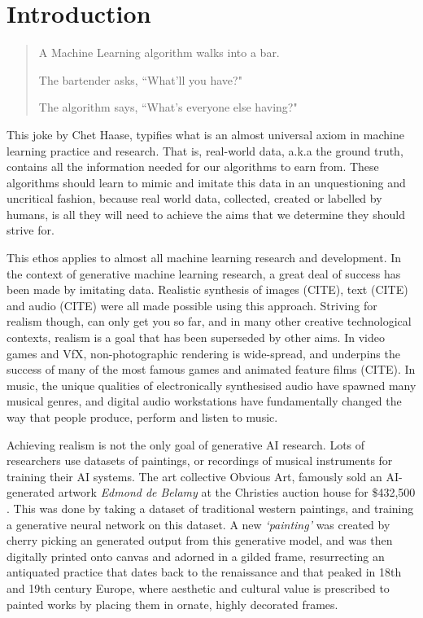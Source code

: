 \chapter{Introduction}
\label{ch:intro}

\begin{quote}A Machine Learning algorithm walks into a bar.

The bartender asks, ``What'll you have?"


The algorithm says, ``What's everyone else having?" \citep{haase2017bar} \end{quote}

This joke by Chet Haase, typifies what is an almost universal axiom in machine learning practice and research. 
That is, real-world data, a.k.a the ground truth, contains all the information needed for our algorithms to earn from. 
These algorithms should learn to mimic and imitate this data in an unquestioning and uncritical fashion, because real world data, collected, created or labelled by humans, is all they will need to achieve the aims that we determine they should strive for.

This ethos applies to almost all machine learning research and development. In the context of generative machine learning research, a great deal of success has been made by imitating data. 
Realistic synthesis of images (CITE), text (CITE) and audio (CITE) were all made possible using this approach. 
Striving for realism though, can only get you so far, and in many other creative technological contexts, realism is a goal that has been superseded by other aims. 
In video games and VfX, non-photographic rendering is wide-spread, and underpins the success of many of the most famous games and animated feature films (CITE). 
In music, the unique qualities of electronically synthesised audio have spawned many musical genres, and digital audio workstations have fundamentally changed the way that people produce, perform and listen to music.

Achieving realism is not the only goal of generative AI research. 
Lots of researchers use datasets of paintings, or recordings of musical instruments for training their AI systems. 
The art collective Obvious Art, famously sold an AI-generated artwork \textit{Edmond de Belamy} at the Christies auction house for \$432,500 \citep{christies2018edmond}.
This was done by taking a dataset of traditional western paintings, and training a generative neural network on this dataset. 
A new \textit{`painting’} was created by cherry picking an generated output from this generative model, and was then digitally printed onto canvas and adorned in a gilded frame, resurrecting an antiquated practice that dates back to the renaissance and that peaked in 18th and 19th century Europe, where aesthetic and cultural value is prescribed to painted works by placing them in ornate, highly decorated frames.

